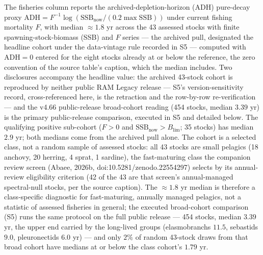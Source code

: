 \documentclass[11pt]{article}
\begin{document}
The fisheries column reports the archived-depletion-horizon (ADH)
pure-decay proxy
\(\mathrm{ADH} = F^{-1}\log(\mathrm{SSB}_{\mathrm{now}}/(0.2\max\mathrm{SSB}))\)
under current fishing mortality \(F\), with median \(\approx 1.8\) yr
across the 43 assessed stocks with finite spawning-stock-biomass (SSB)
and \(F\) series --- the archived pull, designated the headline cohort under the data-vintage rule recorded in S5 --- computed with
\(\mathrm{ADH} = 0\) entered for the eight stocks already at or below
the reference, the zero convention of the source table's caption, which
the median includes. Two disclosures accompany the headline value: the archived 43-stock cohort is reproduced by neither public
RAM Legacy release --- S5's version-sensitivity record, cross-referenced
here, is the retraction and the row-by-row re-verification --- and the
v4.66 public-release broad-cohort reading (454 stocks, median \(3.39\)
yr) is the primary public-release comparison, executed in S5 and
detailed below. The qualifying positive sub-cohort (\(F > 0\) and
\(\mathrm{SSB}_{\mathrm{now}} > B_{\lim}\); 35 stocks) has median
\(2.9\) yr; both medians come from the archived pull alone. The cohort
is a selected class, not a random sample of assessed stocks: all 43
stocks are small pelagics (18 anchovy, 20 herring, 4 sprat, 1 sardine),
the fast-maturing class the companion review screen (Abaee, 2026b, doi:10.5281/\allowbreak{}zenodo.22554297) selects by its annual-review eligibility criterion (42 of the
43 are that screen's annual-managed spectral-null stocks, per the source
caption). The \(\approx 1.8\) yr median is therefore a class-specific
diagnostic for fast-maturing, annually managed pelagics, not a statistic
of assessed fisheries in general; the executed broad-cohort comparison
(S5) runs the same protocol on the full public release --- 454 stocks,
median \(3.39\) yr, the upper end carried by the long-lived groups
(elasmobranchs \(11.5\), sebastids \(9.0\), pleuronectids \(6.0\) yr)
--- and only \(2\%\) of random 43-stock draws from that broad cohort
have medians at or below the class cohort's \(1.79\) yr.
\end{document}
